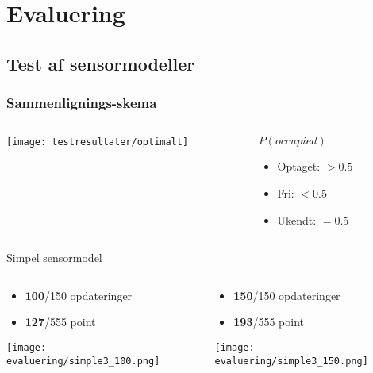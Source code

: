 \section{Evaluering}

\subsection{Test af sensormodeller}
\begin{frame}
\frametitle{Sammenlignings-skema}
\centering
\begin{columns}
\begin{column}{.49\textwidth}
\texttt{[image: testresultater/optimalt]}
\end{column}
\begin{column}{.49\textwidth}
$P(occupied)$
\begin{itemize}
\item Optaget: $> 0.5$
\item Fri: $< 0.5$
\item Ukendt: $= 0.5$
\end{itemize}
\end{column}
\end{columns}
\pause
\vspace{1em}

\end{frame}


\begin{frame}[fragile]{Simpel sensormodel}
	\begin{columns}
		\begin{column}{0.5\textwidth}
			\begin{itemize}
			\item \textbf{100}/150 opdateringer
			\item \textbf{127}/555 point
			\end{itemize}
			\texttt{[image: evaluering/simple3\_100.png]}
		\end{column}
		{\begin{column}{0.5\textwidth}
			\begin{itemize}
			\item \textbf{150}/150 opdateringer
			\item \textbf{193}/555 point
			\end{itemize}
			\texttt{[image: evaluering/simple3\_150.png]}
		\end{column}}
\end{columns}
\end{frame}

